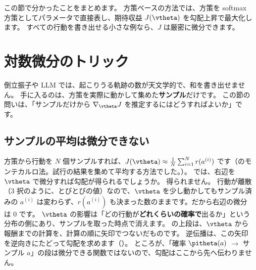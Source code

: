 この節で分かったことをまとめます。
方策ベースの方法では、方策を softmax 方策としてパラメータで直接表し、期待収益 $J(\vtheta)$ を勾配上昇で最大化します。
すべての行動を書き出せる小さな例なら、$J$ は厳密に微分できます。

\section{対数微分のトリック}\label{sec:pg-logtrick}

倒立振子や LLM では、起こりうる軌跡の数が天文学的で、和を書き出せません。
手に入るのは、方策を実際に動かして集めた\textbf{サンプル}だけです。
この節の問いは、「サンプルだけから $\nabla_{\vtheta}J$ を推定するにはどうすればよいか」です。

\subsection*{サンプルの平均は微分できない}

方策から行動を $N$ 個サンプルすれば、$J(\vtheta)\approx\frac1N\sum_{i=1}^{N}r(a^{(i)})$ です（のモンテカルロ法。試行の結果を集めて平均する方法でした。）。
では、右辺を $\vtheta$ で微分すれば勾配が得られるでしょうか。
得られません。
行動が離散（3 択のように、とびとびの値）なので、$\vtheta$ を少し動かしてもサンプル済みの $a^{(i)}$ は変わらず、$r(a^{(i)})$ も決まった数のままです。だから右辺の微分は 0 です。
$\vtheta$ の影響は「どの行動が\textbf{どれくらいの確率で}出るか」という分布の側にあり、サンプルを取った時点で消えます。
の上段は、$\vtheta$ から報酬までの計算を、計算の順に矢印でつないだものです。
逆伝播は、この矢印を逆向きにたどって勾配を求めます（）。
ところが、「確率 $\pitheta(a)$ $\to$ サンプル $a$」の段は微分できる関数ではないので、勾配はここから先へ伝わりません。

